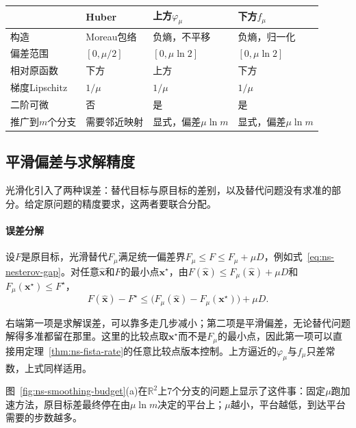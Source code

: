 \begin{BookInlineTable}
  \centering
  \small
  \begin{tabular}{@{}llll@{}}
    \toprule
     & Huber & 上方$\varphi_\mu$ & 下方$f_\mu$\\
    \midrule
    构造 & Moreau包络 & 负熵，不平移 & 负熵，归一化\\
    偏差范围 & $[0,\mu/2]$ & $[0,\mu\ln2]$ & $[0,\mu\ln2]$\\
    相对原函数 & 下方 & 上方 & 下方\\
    梯度Lipschitz & $1/\mu$ & $1/\mu$ & $1/\mu$\\
    二阶可微 & 否 & 是 & 是\\
    推广到$m$个分支 & 需要邻近映射 & 显式，偏差$\mu\ln m$ & 显式，偏差$\mu\ln m$\\
    \bottomrule
  \end{tabular}
  \caption{$\lvert x\rvert$的三种光滑替代。}
  \label{tab:ns-smoothers}
\end{BookInlineTable}

\subsection{平滑偏差与求解精度}
\label{sec:ns-smoothing-accuracy}

光滑化引入了两种误差：替代目标与原目标的差别，以及替代问题没有求准的部分。给定原问题的精度要求，这两者要联合分配。

\paragraph{误差分解}
设$F$是原目标，光滑替代$F_\mu$满足统一偏差界$F_\mu\leq F\leq F_\mu+\mu D$，例如式~\eqref{eq:ns-nesterov-gap}。对任意$\hat{\bm{x}}$和$F$的最小点$\bm{x}^\star$，由$F(\hat{\bm{x}})\leq F_\mu(\hat{\bm{x}})+\mu D$和$F_\mu(\bm{x}^\star)\leq F^\star$，
\begin{equation}
 F(\hat{\bm{x}})-F^\star\leq\bigl(F_\mu(\hat{\bm{x}})-F_\mu(\bm{x}^\star)\bigr)+\mu D.
 \label{eq:ns-smoothing-split}
\end{equation}

右端第一项是求解误差，可以靠多走几步减小；第二项是平滑偏差，无论替代问题解得多准都留在那里。这里的比较点取$\bm{x}^\star$而不是$F_\mu$的最小点，因此第一项可以直接用定理~\ref{thm:ns-fista-rate}的任意比较点版本控制。上方逼近的$\varphi_\mu$与$f_\mu$只差常数，上式同样适用。

图~\ref{fig:ns-smoothing-budget}(a)在$\mathbb{R}^2$上$7$个分支的问题上显示了这件事：固定$\mu$跑加速方法，原目标差最终停在由$\mu\ln m$决定的平台上；$\mu$越小，平台越低，到达平台需要的步数越多。

